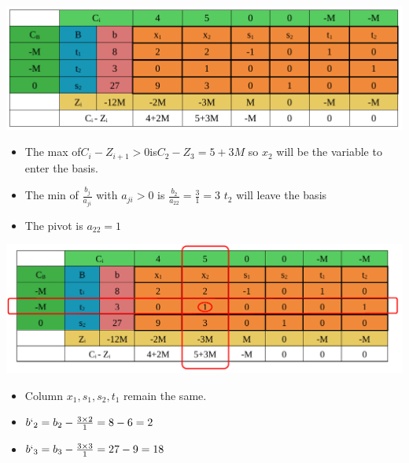 \vspace{0.35cm}

\begin{center}
    \includegraphics{Chapters/Simplexe/EX/EX2/ex2.1.pdf}
\end{center}

\vspace{0.25cm}
\begin{itemize}   
    \item The max of\hspace{0.2cm}\(C_i - Z_{i+1} > 0\)\hspace{0.2cm}is\hspace{0.2cm}\(C_2 - Z_3 = 5+3M\)\hspace{0.1cm} so \(x_2\) 
will be the variable to enter the basis.
\item The min of \hspace{0.1cm}\(\frac{b_j}{a_{ji}}\)\hspace{0.1cm} with \(a_{ji} > 0\)\hspace{0.1cm} is \hspace{0.1cm} \(\frac{b_2}{a_{22}} = \frac{3}{1} = 3\)\hspace{0.35cm} \(t_2\)
will leave the basis
\item The pivot is \(a_{22} = 1\)
 
\end{itemize}

\newpage

\begin{center}
    \includegraphics{Chapters/Simplexe/EX/EX2/ex2.2.pdf}
\end{center}

\vspace{0.25cm}
\begin{itemize}
 \item Column \(x_1 , s_1 , s_2 , t_1\) remain the same.
 \item \(b`_2 = b_2 - \frac{3\times2}{1} = 8 - 6 = 2\)
 \item \(b`_3 = b_3 - \frac{3\times3}{1} = 27 - 9 = 18\)
\end{itemize}

